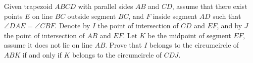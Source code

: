 Given trapezoid $ ABCD$ with parallel sides $ AB$ and $ CD$,  assume that there exist points $ E$ on line $ BC$ outside segment $ BC$,  and $ F$ inside segment $ AD$ such that $ \angle DAE = \angle CBF$. Denote by $ I$ the point of intersection of $ CD$ and $ EF$,  and by $ J$ the point of intersection of $ AB$ and $ EF$. Let $ K$ be the midpoint of segment $ EF$,  assume it does not lie on line $ AB$. Prove that $ I$ belongs to the circumcircle of $ ABK$ if and only if $ K$ belongs to the circumcircle of $ CDJ$.
